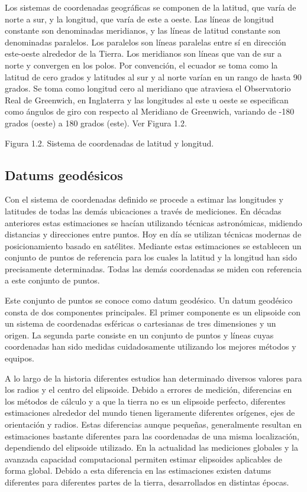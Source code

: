 \documentclass[final,fmstyle]{fpunathesis}
\begin{document}
Los sistemas de coordenadas geográficas se componen de la latitud, que varía de norte a sur, y la longitud, que varía de este a oeste. Las líneas de longitud constante son denominadas meridianos, y las líneas de latitud constante son denominadas paralelos. Los paralelos son líneas paralelas entre sí en dirección este-oeste alrededor de la Tierra. Los meridianos son líneas que van de sur a norte y convergen en los polos. Por convención, el ecuador se toma como la latitud de cero grados y latitudes al sur y al norte varían en un rango de hasta 90 grados. Se toma como longitud cero al meridiano que atraviesa el Observatorio Real de Greenwich, en Inglaterra y las longitudes al este u oeste se especifican como ángulos de giro con respecto al Meridiano de Greenwich, variando de -180 grados (oeste) a 180 grados (este). Ver Figura 1.2.

Figura 1.2. Sistema de coordenadas de latitud y longitud.

\subsection{Datums geodésicos}

Con el sistema de coordenadas definido se procede a estimar las longitudes y latitudes de todas las demás ubicaciones a través de mediciones. En décadas anteriores estas estimaciones se hacían utilizando técnicas astronómicas, midiendo distancias y direcciones entre puntos. Hoy en día se utilizan técnicas modernas de posicionamiento basado en satélites. Mediante estas estimaciones se establecen un conjunto de puntos de referencia para los cuales la latitud y la longitud han sido precisamente determinadas. Todas las demás coordenadas se miden con referencia a este conjunto de puntos.

Este conjunto de puntos se conoce como datum geodésico.  Un datum geodésico consta de dos componentes principales. El primer componente es un elipsoide con un sistema de coordenadas esféricas o cartesianas de tres dimensiones y un origen. La segunda parte consiste en un conjunto de puntos y líneas cuyas coordenadas han sido medidas cuidadosamente utilizando los mejores métodos y equipos.

A lo largo de la historia diferentes estudios han determinado diversos valores para los radios y el centro del elipsoide. Debido a errores de medición, diferencias en los métodos de cálculo y a que la tierra no es un elipsoide perfecto, diferentes estimaciones alrededor del mundo tienen ligeramente diferentes orígenes, ejes de orientación y radios. Estas diferencias aunque pequeñas, generalmente resultan en estimaciones bastante diferentes para las coordenadas de una misma localización,  dependiendo del elipsoide utilizado. En la actualidad las mediciones globales y la avanzada capacidad computacional permiten estimar elipsoides aplicables de forma global. Debido a esta diferencia en las estimaciones existen datums diferentes para diferentes partes de la tierra, desarrollados en distintas épocas.
\end{document}
